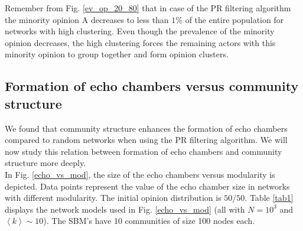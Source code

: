 \documentclass[11 pt , letterpaper , twoside , openright]{book}
\begin{document}
\newline
Remember from Fig. \ref{ev_op_20_80} that in case of the PR filtering algorithm the minority opinion A decreases to less than $1 \%$ of the entire population for networks with high clustering. Even though the prevalence of the minority opinion decreases, the high clustering forces the remaining actors with this minority opinion to group together and form opinion clusters.

\subsection{Formation of echo chambers versus community structure}\label{echoVSmod}

We found that community structure enhances the formation of echo chambers compared to random networks when using the PR filtering algorithm. We will now study this relation between formation of echo chambers and community structure more deeply.\\
\newline
In Fig. \ref{echo_vs_mod}, the size of the echo chambers versus modularity is depicted. Data points represent the value of the echo chamber size in networks with different modularity. The initial opinion distribution is $50/50$. Table \ref{tab1} displays the network models used in Fig. \ref{echo_vs_mod} (all with $N = 10^3$ and $\left<k\right> \sim 10$). The SBM's have 10 communities of size 100 nodes each.
\end{document}
